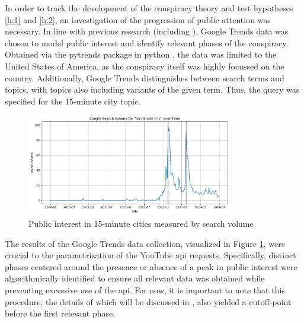 \documentclass[fontsize=11pt, parskip=half]{scrartcl}
\begin{document}
    In order to track the development of the conspiracy theory and test hypotheses \ref{h:1} and \ref{h:2}, an investigation of the progression of public attention was necessary. In line with previous research (including \cite{mavraganiAssessingMethodsTools2018,yeoPublicAttentionLocal2019,junTenYearsResearch2018a}), Google Trends data was chosen to model public interest and identify relevant phases of the conspiracy. Obtained via the pytrends package \parencite{dreyco676Pytrends2023} in python \parencite{vanrossumPythonReferenceManual2009}, the data was limited to the United States of America, as the conspiracy itself was highly focussed on the country. Additionally, Google Trends distinguishes between search terms and topics, with topics also including variants of the given term. Thus, the query was specified for the 15-minute city topic.

    \begin{figure}{}
        \centering
        \setlength\intextsep{0pt}
        \includegraphics[width=0.8\textwidth]{img/gtrends_2-peak.png}
        \vspace{-5pt}
        \caption{Public interest in 15-minute cities measured by search volume}
        \vspace{-10pt}
        \label{fig:gtrends_raw}
    \end{figure}

    The results of the Google Trends data collection, visualized in Figure \ref{fig:gtrends_raw}, were crucial to the parametrization of the YouTube api requests. Specifically, distinct phases centered around the presence or absence of a peak in public interest were algorithmically identified to ensure all relevant data was obtained while preventing excessive use of the api. For now, it is important to note that this procedure, the details of which will be discussed in , also yielded a cutoff-point before the first relevant phase.
\end{document}
